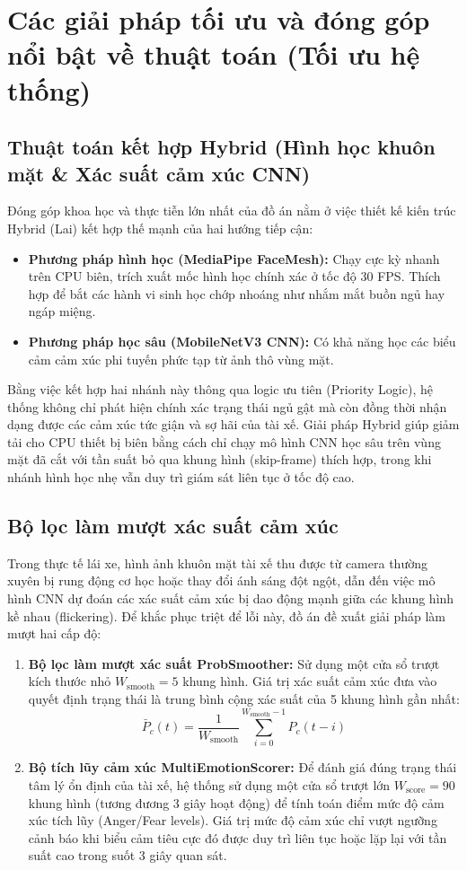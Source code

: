 \documentclass[../DoAn.tex]{subfiles}
\begin{document}
\section{Các giải pháp tối ưu và đóng góp nổi bật về thuật toán (Tối ưu hệ thống)}
\label{section:5.2}

\subsection{Thuật toán kết hợp Hybrid (Hình học khuôn mặt \& Xác suất cảm xúc CNN)}
Đóng góp khoa học và thực tiễn lớn nhất của đồ án nằm ở việc thiết kế kiến trúc Hybrid (Lai) kết hợp thế mạnh của hai hướng tiếp cận:
\begin{itemize}
    \item \textbf{Phương pháp hình học (MediaPipe FaceMesh):} Chạy cực kỳ nhanh trên CPU biên, trích xuất mốc hình học chính xác ở tốc độ 30 FPS. Thích hợp để bắt các hành vi sinh học chớp nhoáng như nhắm mắt buồn ngủ hay ngáp miệng.
    \item \textbf{Phương pháp học sâu (MobileNetV3 CNN):} Có khả năng học các biểu cảm cảm xúc phi tuyến phức tạp từ ảnh thô vùng mặt.
\end{itemize}

Bằng việc kết hợp hai nhánh này thông qua logic ưu tiên (Priority Logic), hệ thống không chỉ phát hiện chính xác trạng thái ngủ gật mà còn đồng thời nhận dạng được các cảm xúc tức giận và sợ hãi của tài xế. Giải pháp Hybrid giúp giảm tải cho CPU thiết bị biên bằng cách chỉ chạy mô hình CNN học sâu trên vùng mặt đã cắt với tần suất bỏ qua khung hình (skip-frame) thích hợp, trong khi nhánh hình học nhẹ vẫn duy trì giám sát liên tục ở tốc độ cao.

\subsection{Bộ lọc làm mượt xác suất cảm xúc}
Trong thực tế lái xe, hình ảnh khuôn mặt tài xế thu được từ camera thường xuyên bị rung động cơ học hoặc thay đổi ánh sáng đột ngột, dẫn đến việc mô hình CNN dự đoán các xác suất cảm xúc bị dao động mạnh giữa các khung hình kề nhau (flickering). Để khắc phục triệt để lỗi này, đồ án đề xuất giải pháp làm mượt hai cấp độ:
\begin{enumerate}
    \item \textbf{Bộ lọc làm mượt xác suất ProbSmoother:} Sử dụng một cửa sổ trượt kích thước nhỏ $W_{\text{smooth}} = 5$ khung hình. Giá trị xác suất cảm xúc đưa vào quyết định trạng thái là trung bình cộng xác suất của 5 khung hình gần nhất:
    \[ \bar{P}_c(t) = \frac{1}{W_{\text{smooth}}} \sum_{i=0}^{W_{\text{smooth}}-1} P_c(t - i) \]
    \item \textbf{Bộ tích lũy cảm xúc MultiEmotionScorer:} Để đánh giá đúng trạng thái tâm lý ổn định của tài xế, hệ thống sử dụng một cửa sổ trượt lớn $W_{\text{score}} = 90$ khung hình (tương đương 3 giây hoạt động) để tính toán điểm mức độ cảm xúc tích lũy (Anger/Fear levels). Giá trị mức độ cảm xúc chỉ vượt ngưỡng cảnh báo khi biểu cảm tiêu cực đó được duy trì liên tục hoặc lặp lại với tần suất cao trong suốt 3 giây quan sát.
\end{enumerate}
\end{document}
